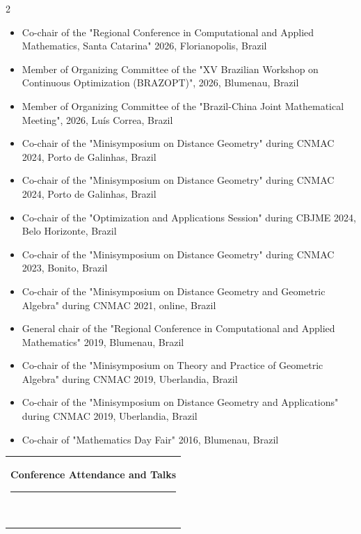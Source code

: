 \documentclass[10pt,A4,english]{article}
\newcommand{\mpwidth}{\linewidth-\fboxsep-\fboxsep}
\newcommand{\cvtext}[1] {
	\begin{tabular*}{1\mpwidth}{p{1.05\mpwidth}}
		\parbox{1\mpwidth}{#1}
	\end{tabular*}
}
\newcommand{\cvsection}[1] {
	\vspace{14pt}
	\cvtext{
		\textbf{\LARGE{\textcolor{darkcol}{#1}}}\\[-4pt]
		\textcolor{accentcol}{ \rule{0.2\textwidth}{1.5pt} } \\
	}
}
\begin{document}
\begin{paracol}{2}
\begin{rightcolumn}
\begin{itemize}[leftmargin=*]
\item Co-chair of the "Regional Conference in Computational and Applied Mathematics, Santa Catarina" 2026, Florianopolis, Brazil

\item Member of Organizing Committee of the
"XV Brazilian Workshop on Continuous Optimization (BRAZOPT)", 2026, Blumenau, Brazil

\item Member of Organizing Committee of the
"Brazil-China Joint Mathematical Meeting", 2026, Luís Correa, Brazil

\item Co-chair of the "Minisymposium on Distance Geometry" during CNMAC 2024, Porto de Galinhas, Brazil

\item Co-chair of the "Minisymposium on Distance Geometry" during CNMAC 2024, Porto de Galinhas, Brazil

\item Co-chair of the "Optimization and Applications Session" during CBJME 2024, Belo Horizonte, Brazil

\item Co-chair of the "Minisymposium on Distance Geometry" during CNMAC 2023, Bonito, Brazil

\item Co-chair of the "Minisymposium on Distance Geometry and Geometric Algebra" during CNMAC 2021, online, Brazil

\item General chair of the "Regional Conference in Computational and Applied Mathematics" 2019, Blumenau, Brazil

\item Co-chair of the "Minisymposium on Theory and Practice of Geometric Algebra" during CNMAC 2019, Uberlandia, Brazil

\item Co-chair of the "Minisymposium on Distance Geometry and Applications" during CNMAC 2019, Uberlandia, Brazil

\item Co-chair of "Mathematics Day Fair" 2016, Blumenau, Brazil

\end{itemize}

\bigskip 

\cvsection{Conference Attendance and Talks}

\begin{itemize}[leftmargin=*]


\end{itemize}
\end{rightcolumn}
\end{paracol}
\end{document}
